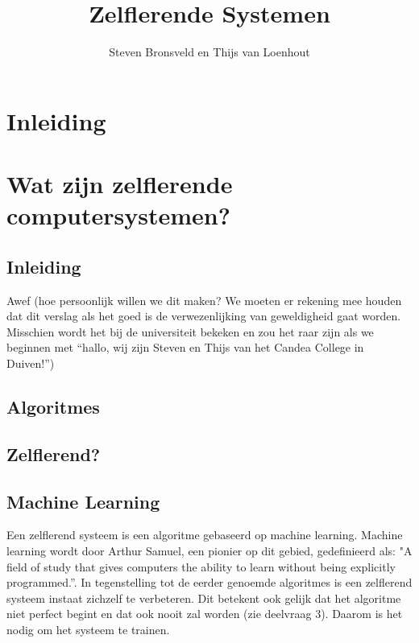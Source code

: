 \documentclass[a4paper]{article}
\title{Zelflerende Systemen}
\author{Steven Bronsveld en Thijs van Loenhout}
\begin{document}
\maketitle

\renewcommand{\contentsname}{Inhoud}

\tableofcontents

\section{Inleiding}

\section{Wat zijn zelflerende computersystemen?}



\subsection{Inleiding}
Awef (hoe persoonlijk willen we dit maken? We moeten er rekening mee houden dat dit verslag als het goed is de verwezenlijking van geweldigheid gaat worden. Misschien wordt het bij de universiteit bekeken en zou het raar zijn als we beginnen met “hallo, wij zijn Steven en Thijs van het Candea College in Duiven!”)


\subsection{Algoritmes}

\subsection{Zelflerend?}

\subsection{Machine Learning}
Een zelflerend systeem is een algoritme gebaseerd op machine learning. Machine learning wordt door Arthur Samuel, een pionier op dit gebied, gedefinieerd als: "A field of study that gives computers the ability to learn without being explicitly programmed.”\cite{ArthurSamuel}. In tegenstelling tot de eerder genoemde algoritmes is een zelflerend systeem instaat zichzelf te verbeteren. Dit betekent ook gelijk dat het algoritme niet perfect begint en dat ook nooit zal worden (zie deelvraag 3). Daarom is het nodig om het systeem te trainen. 
\end{document}
